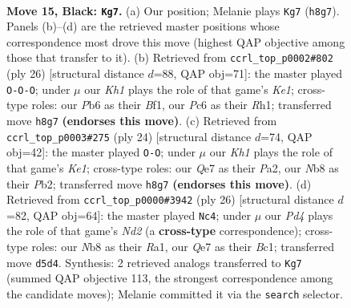 \documentclass[11pt]{article}
\begin{document}
\clearpage

\begin{figure}[p]\centering
\begin{subfigure}{0.46\textwidth}\centering
\resizebox{\linewidth}{!}{%
\newchessgame
\chessboard[
  setfen={rnb1r2k/p2nq2p/1pp1p1p1/3pP3/8/2N5/PPPQ1PPP/1K2RBNR b - - 1 15},
  showmover=false,
  pgfstyle=straightmove, color=movearrow, markmove={h8-g7}
]}
\caption{}
\end{subfigure}\hfill
\begin{subfigure}{0.46\textwidth}\centering
\resizebox{\linewidth}{!}{%
\newchessgame
\chessboard[
  setfen={r1b1k2r/1pp1bp1p/n6q/p2P1p2/2P1pP2/2N3P1/PPQ1N2P/R3KB1R w KQkq - 0 14},
  showmover=false,
  pgfstyle=straightmove, color=movearrow, markmove={e1-c1}
]}
\caption{}
\end{subfigure}
\\[4pt]
\begin{subfigure}{0.46\textwidth}\centering
\resizebox{\linewidth}{!}{%
\newchessgame
\chessboard[
  setfen={r3k2r/pppbnppp/2np1q2/8/4PP2/1NPB1Q2/PP1N2PP/R3K2R w KQkq - 5 13},
  showmover=false,
  pgfstyle=straightmove, color=movearrow, markmove={e1-g1}
]}
\caption{}
\end{subfigure}\hfill
\begin{subfigure}{0.46\textwidth}\centering
\resizebox{\linewidth}{!}{%
\newchessgame
\chessboard[
  setfen={r1bqr1k1/2p2pp1/1bp2n1p/p3p3/4P3/2P2N1P/PPQN1PP1/R1B1R1K1 w - - 0 14},
  showmover=false,
  pgfstyle=straightmove, color=movearrow, markmove={d2-c4}
]}
\caption{}
\end{subfigure}
\caption{\textbf{Move 15, Black: \texttt{Kg7}.} (a) Our position; Melanie plays \texttt{Kg7} (\texttt{h8g7}). Panels (b)--(d) are the retrieved master positions whose correspondence most drove this move (highest QAP objective among those that transfer to it). (b) Retrieved from \texttt{ccrl\_top\_p0002\#802} (ply 26) [structural distance $d$=88, QAP obj=71]: the master played \texttt{O-O-O}; under $\mu$ our \emph{Kh1} plays the role of that game's \emph{Ke1}; cross-type roles: our \emph{P}b6 as their \emph{B}f1, our \emph{P}c6 as their \emph{R}h1; transferred move \texttt{h8g7} \textbf{(endorses this move)}. (c) Retrieved from \texttt{ccrl\_top\_p0003\#275} (ply 24) [structural distance $d$=74, QAP obj=42]: the master played \texttt{O-O}; under $\mu$ our \emph{Kh1} plays the role of that game's \emph{Ke1}; cross-type roles: our \emph{Q}e7 as their \emph{P}a2, our \emph{N}b8 as their \emph{P}b2; transferred move \texttt{h8g7} \textbf{(endorses this move)}. (d) Retrieved from \texttt{ccrl\_top\_p0000\#3942} (ply 26) [structural distance $d$=82, QAP obj=64]: the master played \texttt{Nc4}; under $\mu$ our \emph{Pd4} plays the role of that game's \emph{Nd2} (a \textbf{cross-type} correspondence); cross-type roles: our \emph{N}b8 as their \emph{R}a1, our \emph{Q}e7 as their \emph{B}c1; transferred move \texttt{d5d4}. Synthesis: 2 retrieved analogs transferred to \texttt{Kg7} (summed QAP objective 113, the strongest correspondence among the candidate moves); Melanie committed it via the \texttt{search} selector.}
\label{fig:thought-m29}
\end{figure}
\end{document}
